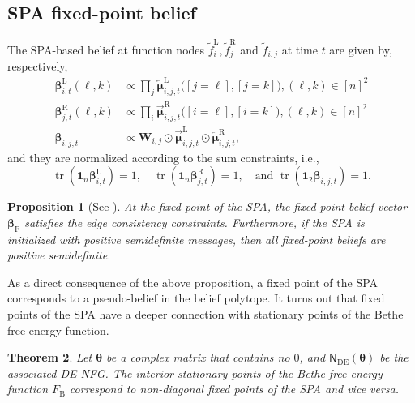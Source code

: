 \documentclass[conference]{IEEEtran}
\theoremstyle{plain}
\newtheorem{thm}{Theorem}
\newtheorem{prop}[thm]{Proposition}
\theoremstyle{definition}
\newcommand{\B}{\mathrm{B}}
\newcommand{\tr}{\operatorname{tr}}
\newcommand{\sfn}{\mathsf{N}}
\newcommand{\tfr}[1]{\widetilde{f}^{\mathrm{R}}_{ #1 }}
\newcommand{\tfl}[1]{\widetilde{f}^{\mathrm{L}}_{ #1 }}
\newcommand{\tfe}[1]{\widetilde {f}_{ #1 }}
\newcommand{\bbeta}{\boldsymbol{\beta}}
\newcommand{\br}[1]{\bbeta^{\mathrm{R}}_{#1}}
\newcommand{\bl}[1]{\bbeta^{\mathrm{L}}_{#1}}
\newcommand{\be}[1]{\bbeta_{#1}}
\newcommand{\muleft}[2]{\overleftarrow{\boldsymbol{\mu}}^{\mathrm{#1}}_{#2}}
\newcommand{\muright}[2]{\overrightarrow{\boldsymbol{\mu}}^{\mathrm{#1}}_{#2}}
\newcommand{\btheta}{\boldsymbol{\theta}}
\newcommand{\sfnDE}{\sfn_{\mathrm{DE}}}
\begin{document}
 \subsection{SPA fixed-point belief}
 The SPA-based belief at function nodes $\tfl{i},\tfr{j}$ and $\tfe{i,j}$ at
 time $t$ are given by, respectively,
 \begin{align*}
  \bl{i,t}(\ell,k) & \propto \prod_{j}\muleft{L}{i,j,t}\big([j=\ell],[j=k]\big),(\ell,k)\in[n]^2  \\
  \br{j,t}(\ell,k) & \propto \prod_{i}\muright{R}{i,j,t}\big([i=\ell],[i=k]\big),(\ell,k)\in[n]^2 \\
  \be{i,j,t}       & \propto \mathbf W_{i,j}\odot\muright{L}{i,j,t}\odot\muleft{R}{i,j,t},
 \end{align*}
 and they are normalized according to the sum constraints, i.e.,
 \[
  \tr(\mathbf{1}_{n}\bl{i,t})=1, \quad
  \tr(\mathbf{1}_{n}\br{j,t})=1, \quad \text{and }
  \tr(\mathbf{1}_{2}\be{i,j,t})=1.
 \]

 \begin{prop}[See \protect\cite{caoDoubleedgeFactorGraphs2017}]
  At the fixed point of the SPA, the fixed-point belief vector $\bbeta_{\mathrm F}$ satisfies the edge consistency
  constraints. Furthermore, if the SPA is initialized with positive semidefinite messages, then
  all fixed-point beliefs are positive semidefinite.
 \end{prop}
 As a direct consequence of the above proposition, a fixed point of the SPA corresponds to
 a pseudo-belief in the belief polytope. It turns out that fixed points of the SPA have
 a deeper connection with stationary points of the Bethe free energy function.

 \begin{thm} \label{thm:stationary:fixedpoint}
  Let $\btheta$ be a complex matrix that contains no $0$, and $\sfnDE(\btheta)$ be the
  associated DE-NFG. The interior stationary points of the Bethe free energy function $F_\B$
  correspond to non-diagonal fixed points of the SPA and vice versa.
 \end{thm}
\end{document}
